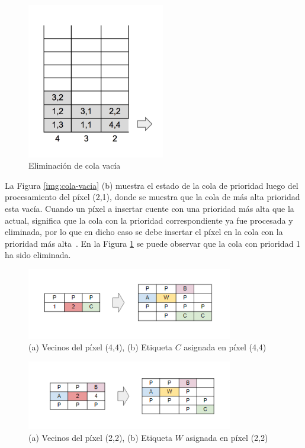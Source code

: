\begin{figure}[h!]
\centering
\includegraphics[width=60mm]{./inundacion/cola-eliminada.png}
\caption{Eliminación de cola vacía}
\label{img:cola-eliminada}
\end{figure}

La Figura \ref{img:cola-vacia} (b) muestra el estado de la cola de prioridad luego del procesamiento del píxel (2,1), donde se muestra que la cola de más alta prioridad esta vacía. Cuando un píxel a insertar cuente con una prioridad más alta que la actual, significa que la cola con la prioridad correspondiente ya fue procesada y eliminada, por lo que en dicho caso se debe insertar el píxel en la cola con la prioridad más alta~\cite{Meyer}. En la Figura \ref{img:cola-eliminada} se puede observar que la cola con prioridad 1 ha sido eliminada.
\begin{figure}[h!]
\centering
\includegraphics[width=90mm]{./inundacion/unico-label.png}
\caption{(a) Vecinos del píxel (4,4), (b) Etiqueta $C$ asignada en píxel (4,4)}
\label{img:unico-label}
\end{figure}
\begin{figure}[h!]
\centering
\includegraphics[width=90mm]{./inundacion/varios-label.png}
\caption{(a) Vecinos del píxel (2,2), (b) Etiqueta $W$ asignada en píxel (2,2)}
\label{img:varios-label}
\end{figure}


